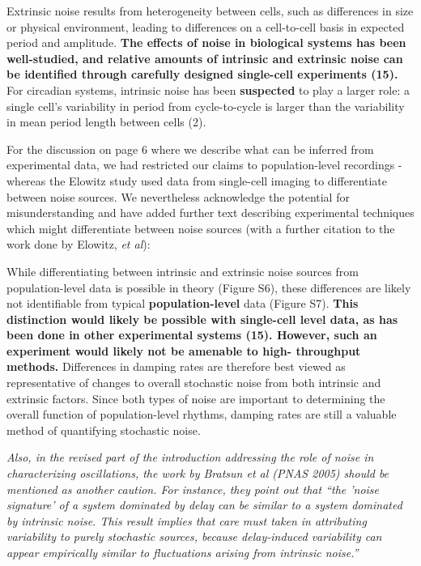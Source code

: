 \documentclass[11pt, letterpaper]{article}
\newenvironment{reviewer}{\itshape\color{gray}}{}
\newenvironment{manuscript}[1]{\begin{center}\begin{tcolorbox}[colback=green!5!white,colframe=green!75!black,width=\textwidth,title={#1},breakable,fonttitle=\bfseries]}{\end{tcolorbox}\end{center}}
\begin{document}
\begin{manuscript}{Page 3}
Extrinsic noise results from heterogeneity between cells, such as differences in size or physical environment, leading to differences on a cell-to-cell basis in expected period and amplitude. 
{\bfseries The effects of noise in biological systems has been well-studied, and relative amounts of intrinsic and extrinsic noise can be identified through carefully designed single-cell experiments (15). }
For circadian systems, intrinsic noise has been {\bfseries suspected} to play a larger role: a single cell's variability in period from cycle-to-cycle is larger than the variability in mean period length between cells (2).
\end{manuscript}

For the discussion on page 6 where we describe what can be inferred from experimental data, we had restricted our claims to population-level recordings - whereas the Elowitz study used data from single-cell imaging to differentiate between noise sources. We nevertheless acknowledge the potential for misunderstanding and have added further text describing experimental techniques which might differentiate between noise sources (with a further citation to the work done by Elowitz, {\itshape et al}):

\begin{manuscript}{Page 7}
While differentiating between intrinsic and extrinsic noise sources from population-level data is possible in theory (Figure S6), these differences are likely not identifiable from typical {\bfseries population-level} data (Figure S7). 
{\bfseries This distinction would likely be possible with single-cell level data, as has been done in other experimental systems (15). 
However, such an experiment would likely not be amenable to high- throughput methods.}
Differences in damping rates are therefore best viewed as representative of changes to overall stochastic noise from both intrinsic and extrinsic factors. 
Since both types of noise are important to determining the overall function of population-level rhythms, damping rates are still a valuable method of quantifying stochastic noise.
\end{manuscript}

\begin{reviewer}
Also, in the revised part of the introduction addressing the role of noise in characterizing oscillations, the work by Bratsun et al (PNAS 2005) should be mentioned as another caution. For instance, they point out that ``the 'noise signature' of a system dominated by delay can be similar to a system dominated by intrinsic noise. This result implies that care must taken in attributing variability to purely stochastic sources, because delay-induced variability can appear empirically similar to fluctuations arising from intrinsic noise.''
\end{reviewer}
\end{document}
